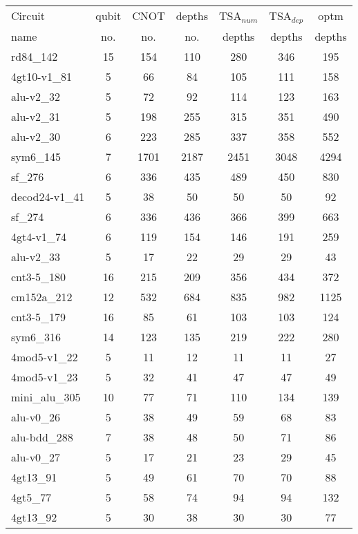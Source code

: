 \documentclass[journal]{IEEEtran}
\begin{document}
\begin{table*}[htbp]
    \begin{center}  
        \begin{tabular}{|p{4.3cm}<{\centering}|c|c|c|c|c|c|}
                            \hline
                            Circuit &  qubit  & CNOT &depths &TSA$_{num}$& TSA$_{dep}$  & optm 	  	\\
                             name	&   no. 	&	no. & no. & depths&  depths &  depths 	\\
                            \hline
rd84\_142 & 15 & 154 & 110 & 280 & 346 & 195 \\ 
4gt10-v1\_81 & 5 & 66 & 84 & 105 & 111 & 158 \\ 
alu-v2\_32 & 5 & 72 & 92 & 114 & 123 & 163 \\ 
alu-v2\_31 & 5 & 198 & 255 & 315 & 351 & 490 \\ 
alu-v2\_30 & 6 & 223 & 285 & 337 & 358 & 552 \\ 
sym6\_145 & 7 & 1701 & 2187 & 2451 & 3048 & 4294 \\ 
sf\_276 & 6 & 336 & 435 & 489 & 450 & 830 \\ 
decod24-v1\_41 & 5 & 38 & 50 & 50 & 50 & 92 \\ 
sf\_274 & 6 & 336 & 436 & 366 & 399 & 663 \\ 
4gt4-v1\_74 & 6 & 119 & 154 & 146 & 191 & 259 \\ 
alu-v2\_33 & 5 & 17 & 22 & 29 & 29 & 43 \\ 
cnt3-5\_180 & 16 & 215 & 209 & 356 & 434 & 372 \\ 
cm152a\_212 & 12 & 532 & 684 & 835 & 982 & 1125 \\ 
cnt3-5\_179 & 16 & 85 & 61 & 103 & 103 & 124 \\ 
sym6\_316 & 14 & 123 & 135 & 219 & 222 & 280 \\ 
4mod5-v1\_22 & 5 & 11 & 12 & 11 & 11 & 27 \\ 
4mod5-v1\_23 & 5 & 32 & 41 & 47 & 47 & 49 \\ 
mini\_alu\_305 & 10 & 77 & 71 & 110 & 134 & 139 \\ 
alu-v0\_26 & 5 & 38 & 49 & 59 & 68 & 83 \\ 
alu-bdd\_288 & 7 & 38 & 48 & 50 & 71 & 86 \\ 
alu-v0\_27 & 5 & 17 & 21 & 23 & 29 & 45 \\ 
4gt13\_91 & 5 & 49 & 61 & 70 & 70 & 88 \\ 
4gt5\_77 & 5 & 58 & 74 & 94 & 94 & 132 \\ 
4gt13\_92 & 5 & 30 & 38 & 30 & 30 & 77 \\ 

\end{tabular}
\end{center}
\end{table*}
\end{document}
